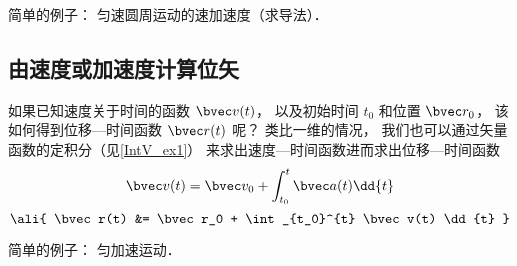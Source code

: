 简单的例子： 匀速圆周运动的速加速度（求导法）．

\subsection{由速度或加速度计算位矢}

如果已知速度关于时间的函数 $\bvec v(t)$， 以及初始时间 $t_0$ 和位置 $\bvec r_0$， 该如何得到位移—时间函数 $\bvec r(t)$ 呢？ 类比一维的情况， 我们也可以通过矢量函数的定积分（见\autoref{IntV_ex1}） 来求出速度—时间函数进而求出位移—时间函数
\begin{equation}
\bvec v(t) = \bvec v_0 + \int_{t_0}^{t} \bvec a(t) \dd{t}
\end{equation}
\begin{equation}\ali{
\bvec r(t) &= \bvec r_0 + \int_{t_0}^{t} \bvec v(t) \dd{t}
}\end{equation}

简单的例子： 匀加速运动．
